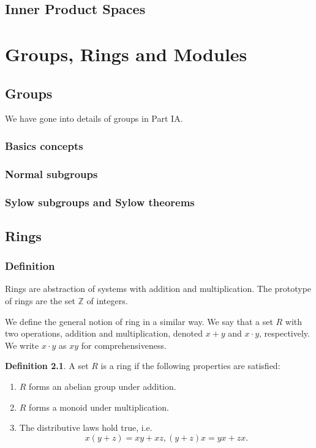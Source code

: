 \documentclass[12pt]{book}
\newcommand{\ZZ}{\mathbb Z}
\theoremstyle{definition}
\newtheorem{definition}{Definition}[section]
\theoremstyle{remark}
\begin{document}
		\section{Inner Product Spaces}
		
		
	\chapter{Groups, Rings and Modules}
		\section{Groups}
		We have gone into details of groups in Part IA.
			\subsection{Basics concepts}
			
			\subsection{Normal subgroups}
			
			\subsection{Sylow subgroups and Sylow theorems}
		\section{Rings}
			\subsection{Definition}
			Rings are abstraction of systems with addition and multiplication. The prototype of rings are the set $\ZZ$ of integers.
			
			We define the general notion of ring in a similar way. We say that a set $R$ with two operations, addition and multiplication, denoted $x + y$ and $x \cdot y$, respectively.
			We write $x \cdot y$ as $xy$ for comprehensiveness.
			\begin{definition}
				A set $R$ is a ring if the following properties are satisfied:
				\begin{enumerate}
					\item $R$ forms an abelian group under addition.
					\item $R$ forms a monoid under multiplication.
					\item The distributive laws hold true, i.e.
					\begin{equation*}
						x(y + z) = xy + xz, (y + z)x = yx + zx.
					\end{equation*}
				\end{enumerate}
			\end{definition}
\end{document}
